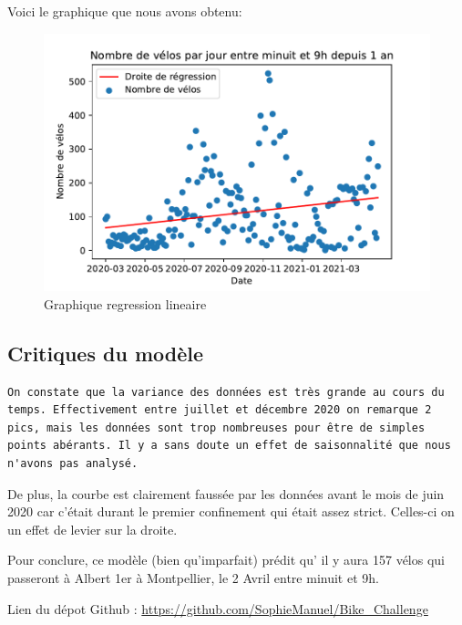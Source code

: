 \documentclass[
]{article}
\begin{document}
\newpage

Voici le graphique que nous avons obtenu:

\begin{figure}
\centering
\includegraphics{Graph regression lineaire.pdf}
\caption{Graphique regression lineaire}
\end{figure}

\hypertarget{critiques-du-moduxe8le}{%
\subsection{Critiques du modèle}\label{critiques-du-moduxe8le}}

\begin{verbatim}
On constate que la variance des données est très grande au cours du temps. Effectivement entre juillet et décembre 2020 on remarque 2 pics, mais les données sont trop nombreuses pour être de simples points abérants. Il y a sans doute un effet de saisonnalité que nous n'avons pas analysé.
\end{verbatim}

De plus, la courbe est clairement faussée par les données avant le mois
de juin 2020 car c'était durant le premier confinement qui était assez
strict. Celles-ci on un effet de levier sur la droite.

Pour conclure, ce modèle (bien qu'imparfait) prédit qu' il y aura 157
vélos qui passeront à Albert 1er à Montpellier, le 2 Avril entre minuit
et 9h.

Lien du dépot Github :
\url{https://github.com/SophieManuel/Bike_Challenge}
\end{document}
